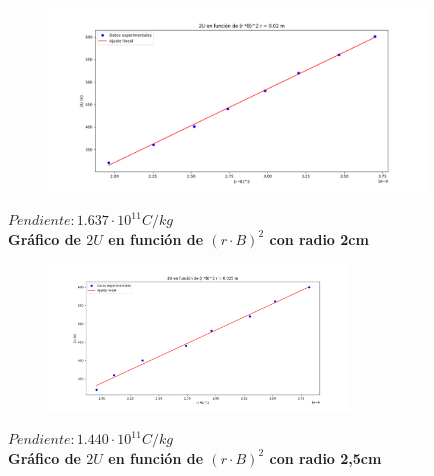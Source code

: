 \documentclass[a4paper]{article}
\begin{document}
    \begin{figure}[h!]
        \centering
        \vspace{-2mm}
        \includegraphics[width = 10cm] {../imagenes/radio2.png}
        \vspace{-5mm}
    \end{figure}

    \begin{center}
        \textbf{$Pendiente: 1.637 \cdot 10^{11} C/kg$} \\
        \textbf{Gráfico de $2U$ en función de $(r \cdot B)^2$ con radio 2cm} \\
    \end{center}

    \begin{figure}[h!]
        \centering
        \vspace{-2mm}
        \includegraphics[width = 8cm] {../imagenes/radio2,5.png}
        \vspace{-5mm}
    \end{figure}

    \begin{center}
        \textbf{$Pendiente: 1.440 \cdot 10^{11} C/kg$} \\
        \textbf{Gráfico de $2U$ en función de $(r \cdot B)^2$ con radio 2,5cm} \\
    \end{center}
\end{document}
